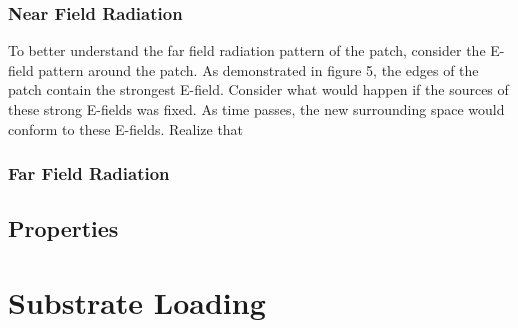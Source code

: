 \documentclass[12pt]{article}
\begin{document}
\subsubsection{Near Field Radiation}

To better understand the far field radiation pattern of the patch, consider the E-field pattern around the patch. As demonstrated in figure 5, the edges of the patch contain the strongest E-field. Consider what would happen if the sources of these strong E-fields was fixed. As time passes, the new surrounding space would conform to these E-fields. Realize that  

\subsubsection{Far Field Radiation}


\subsection{Properties}

\section{Substrate Loading}

\newpage


\end{document}
